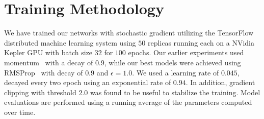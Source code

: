 \section{Training Methodology}
We have trained our networks with stochastic gradient utilizing the
TensorFlow~\cite{tensorflow2015-whitepaper} distributed machine learning system
using $50$ replicas running each on a NVidia Kepler GPU with batch size $32$
for $100$ epochs.
Our earlier experiments used momentum~\cite{icml2013_sutskever13} with a
decay of $0.9$, while our best models were achieved using RMSProp~\cite{rmsprop}
with decay of $0.9$ and $\epsilon=1.0$. We used a learning rate of $0.045$,
decayed every two epoch using an exponential rate of $0.94$.
In addition, gradient clipping \cite{pascanu2012difficulty} with threshold $2.0$
was found to be useful to stabilize the training. Model evaluations are
performed using a running average of the parameters computed over time.
